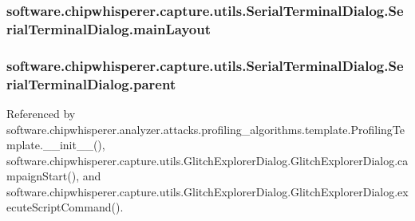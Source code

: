 \subsubsection[{main\+Layout}]{\setlength{\rightskip}{0pt plus 5cm}software.\+chipwhisperer.\+capture.\+utils.\+Serial\+Terminal\+Dialog.\+Serial\+Terminal\+Dialog.\+main\+Layout}\label{classsoftware_1_1chipwhisperer_1_1capture_1_1utils_1_1SerialTerminalDialog_1_1SerialTerminalDialog_a34e2bc7e9f3c04fb75bbe21212d91bcc}
\hypertarget{classsoftware_1_1chipwhisperer_1_1capture_1_1utils_1_1SerialTerminalDialog_1_1SerialTerminalDialog_a8ced666bf19c9e5ffe932e0f282b862c}{}
\subsubsection[{parent}]{\setlength{\rightskip}{0pt plus 5cm}software.\+chipwhisperer.\+capture.\+utils.\+Serial\+Terminal\+Dialog.\+Serial\+Terminal\+Dialog.\+parent}\label{classsoftware_1_1chipwhisperer_1_1capture_1_1utils_1_1SerialTerminalDialog_1_1SerialTerminalDialog_a8ced666bf19c9e5ffe932e0f282b862c}


Referenced by software.\+chipwhisperer.\+analyzer.\+attacks.\+profiling\+\_\+algorithms.\+template.\+Profiling\+Template.\+\_\+\+\_\+init\+\_\+\+\_\+(), software.\+chipwhisperer.\+capture.\+utils.\+Glitch\+Explorer\+Dialog.\+Glitch\+Explorer\+Dialog.\+campaign\+Start(), and software.\+chipwhisperer.\+capture.\+utils.\+Glitch\+Explorer\+Dialog.\+Glitch\+Explorer\+Dialog.\+execute\+Script\+Command().

\hypertarget{classsoftware_1_1chipwhisperer_1_1capture_1_1utils_1_1SerialTerminalDialog_1_1SerialTerminalDialog_ad147f63bbb2096d3d1469176cf05d988}{}
